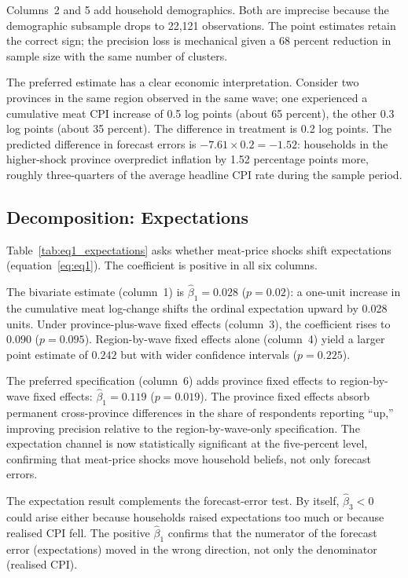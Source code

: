Columns~2 and 5 add household demographics.
Both are imprecise because the demographic subsample drops to
22,121 observations.
The point estimates retain the correct sign; the precision
loss is mechanical given a 68 percent reduction in sample
size with the same number of clusters.

The preferred estimate has a clear economic interpretation.
Consider two provinces in the same region observed in the same
wave; one experienced a cumulative meat CPI increase of
0.5 log points (about 65 percent), the other 0.3 log points
(about 35 percent).
The difference in treatment is 0.2 log points.
The predicted difference in forecast errors is
$-7.61 \times 0.2 = -1.52$: households in the higher-shock
province overpredict inflation by 1.52 percentage points more,
roughly three-quarters of the average headline CPI rate during
the sample period.

\subsection{Decomposition: Expectations}%
\label{sec:eq1_results}



Table~\ref{tab:eq1_expectations} asks whether meat-price shocks
shift expectations (equation~\eqref{eq:eq1}).
The coefficient is positive in all six columns.

The bivariate estimate (column~1) is
$\hat{\beta}_1 = 0.028$ ($p = 0.02$): a one-unit increase in
the cumulative meat log-change shifts the ordinal expectation
upward by 0.028 units.
Under province-plus-wave fixed effects (column~3), the
coefficient rises to $0.090$ ($p = 0.095$).
Region-by-wave fixed effects alone (column~4) yield a larger
point estimate of $0.242$ but with wider confidence intervals
($p = 0.225$).

The preferred specification (column~6) adds province fixed
effects to region-by-wave fixed effects:
$\hat{\beta}_1 = 0.119$ ($p = 0.019$).
The province fixed effects absorb permanent cross-province
differences in the share of respondents reporting ``up,''
improving precision relative to the region-by-wave-only
specification.
The expectation channel is now statistically significant at
the five-percent level, confirming that meat-price shocks move
household beliefs, not only forecast errors.

The expectation result complements the forecast-error test.
By itself, $\hat{\beta}_3 < 0$ could arise either because
households raised expectations too much or because realised
CPI fell.
The positive $\hat{\beta}_1$ confirms that the numerator of the
forecast error (expectations) moved in the wrong direction,
not only the denominator (realised CPI).


